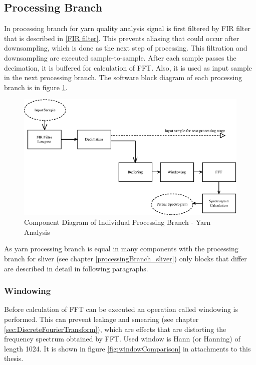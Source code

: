 \documentclass[twoside]{ctuthesis}
\theoremstyle{plain}
\theoremstyle{definition}
\theoremstyle{note}
\begin{document}
\subsection{Processing Branch}
In processing branch for yarn quality analysis signal is first filtered by FIR filter that is described in \ref{FIR filter}. This prevents aliasing that could occur after downsampling, which is done as the next step of processing. This filtration and downsampling are executed sample-to-sample. After each sample passes the decimation, it is buffered for calculation of FFT. Also, it is used as input sample in the next processing branch. The software block diagram of each processing branch is in figure \ref{fig:singleBranch_yarn}.
\begin{figure}[h]
	\centering
	\includegraphics[width=1.0\textwidth]{yarn_singleBranch.eps}
	\caption{Component Diagram of Individual Processing Branch - Yarn Analysis}
	\label{fig:singleBranch_yarn}
\end{figure}

As yarn processing branch is equal in many components with the processing branch for sliver (see chapter \ref{processingBranch_sliver}) only blocks that differ are described in detail in following paragraphs.

\subsubsection{Windowing}
Before calculation of FFT can be executed an operation called windowing is performed. This can prevent leakage and smearing (see chapter \ref{sec:DiscreteFourierTransform}), which are effects that are distorting the frequency spectrum obtained by FFT. Used window is Hann (or Hanning) of length 1024. It is shown in figure \ref{fig:windowComparison} in attachments to this thesis.
\end{document}
